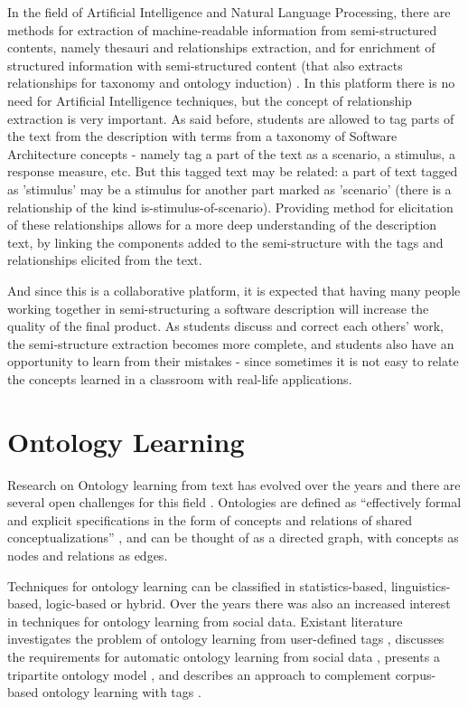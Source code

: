 In the field of Artificial Intelligence and Natural Language Processing, there are methods for extraction of machine-readable information from semi-structured contents, namely thesauri and relationships extraction, and for enrichment of structured information with semi-structured content (that also extracts relationships for taxonomy and ontology induction) \cite{hovy2013collaboratively}. In this platform there is no need for Artificial Intelligence techniques, but the concept of relationship extraction is very important. As said before, students are allowed to tag parts of the text from the description with terms from a taxonomy of Software Architecture concepts - namely tag a part of the text as a scenario, a stimulus, a response measure, etc. But this tagged text may be related: a part of text tagged as 'stimulus' may be a stimulus for another part marked as 'scenario' (there is a relationship of the kind is-stimulus-of-scenario). Providing method for elicitation of these relationships allows for a more deep understanding of the description text, by linking the components added to the semi-structure with the tags and relationships elicited from the text.

And since this is a collaborative platform, it is expected that having many people working together in semi-structuring a software description will increase the quality of the final product. 
As students discuss and correct each others' work, the semi-structure extraction becomes more complete, and students also have an opportunity to learn from their mistakes - since sometimes it is not easy to relate the concepts learned in a classroom with real-life applications.


	
\section{Ontology Learning}
Research on Ontology learning from text has evolved over the years and there are several open challenges for this field \cite{wong2012ontology}. Ontologies are defined as ``effectively formal and explicit specifications in the form of concepts and relations of shared conceptualizations'' \cite{gruber1993translation}, and can be thought of as a directed graph, with concepts as nodes and relations as edges.
 
Techniques for ontology learning can be classified in statistics-based, linguistics-based, logic-based or hybrid. Over the years there was also an increased interest in techniques for ontology learning from social data. Existant literature investigates the problem of ontology learning from user-defined tags \cite{tang2009towards}, discusses the requirements for automatic ontology learning from social data \cite{kotis2011automated}, presents a tripartite ontology model \cite{mika2007ontologies}, and describes an approach to complement corpus-based ontology learning with tags \cite{weichselbraun2010augmenting}.

